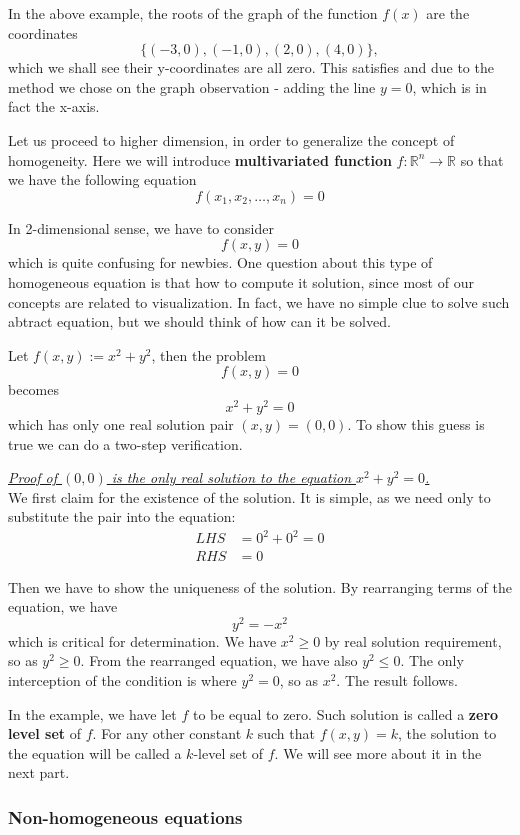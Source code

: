 \documentclass[12pt]{article}
\renewenvironment{proof}[1][Proof]{\begin{snugshade*} \underline{\textit{{#1}.}}\\}{\hfill \qedsymbol \end{snugshade*}}
\begin{document}
    In the above example, the roots of the graph of the function $f(x)$ are the coordinates $$\{(-3,0), (-1,0), (2,0), (4,0)\},$$ which we shall see their y-coordinates are all zero. This satisfies and due to the method we chose on the graph observation - adding the line $y=0$, which is in fact the x-axis.

    Let us proceed to higher dimension, in order to generalize the concept of homogeneity. Here we will introduce \textbf{multivariated function} $f:\mathbb{R}^n\to \mathbb{R}$ so that we have the following equation \[f(x_1,x_2,\dots ,x_n)=0\]

    In 2-dimensional sense, we have to consider \[f(x,y)=0\] which is quite confusing for newbies. One question about this type of homogeneous equation is that how to compute it solution, since most of our concepts are related to visualization. In fact, we have no simple clue to solve such abtract equation, but we should think of how can it be solved.

    Let $f(x,y):=x^2+y^2$, then the problem \[f(x,y)=0\] becomes \[x^2+y^2=0\] which has only one real solution pair $(x,y)=(0,0)$. To show this guess is true we can do a two-step verification.

    \begin{proof}[Proof of $(0,0)$ is the only real solution to the equation $x^2+y^2=0$]
        We first claim for the existence of the solution. It is simple, as we need only to substitute the pair into the equation:\begin{align*}
            LHS &= 0^2+0^2=0\\
            RHS &= 0
        \end{align*}

        Then we have to show the uniqueness of the solution. By rearranging terms of the equation, we have \[y^2=-x^2\] which is critical for determination. We have $x^2\geq 0$ by real solution requirement, so as $y^2\geq 0$. From the rearranged equation, we have also $y^2\leq 0$. The only interception of the condition is where $y^2=0$, so as $x^2$. The result follows.
    \end{proof}

    In the example, we have let $f$ to be equal to zero. Such solution is called a \textbf{zero level set} of $f$. For any other constant $k$ such that $f(x,y)=k$, the solution to the equation will be called a $k$-level set of $f$. We will see more about it in the next part.

    \subsubsection*{Non-homogeneous equations}
\end{document}

